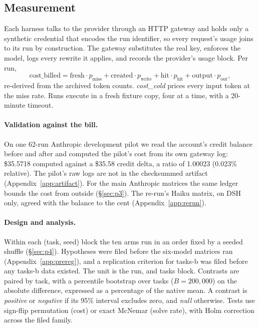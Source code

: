 \documentclass[10pt]{article}
\begin{document}
\subsection{Measurement}\label{sec:measurement}

Each harness talks to the provider through an HTTP gateway and holds only a synthetic credential that
encodes the run identifier, so every request's usage joins to its run by construction. The gateway
substitutes the real key, enforces the model, logs every rewrite it applies, and records the
provider's usage block. Per run,
\[
\text{cost\_billed} = \text{fresh}\cdot p_{\text{miss}} + \text{created}\cdot p_{\text{write}} +
\text{hit}\cdot p_{\text{hit}} + \text{output}\cdot p_{\text{out}},
\]
re-derived from the archived token counts. \emph{cost\_cold} prices every input token at the miss
rate. Runs execute in a fresh fixture copy, four at a time, with a 20-minute timeout.

\paragraph{Validation against the bill.} On one 62-run Anthropic development pilot we read the account's credit
balance before and after and computed the pilot's cost from its own gateway log: \$35.5718 computed
against a \$35.58 credit delta, a ratio of 1.00023 (0.023\% relative). The pilot's raw logs are not in
the checksummed artifact (Appendix~\ref{app:artifact}). For the main Anthropic matrices the same ledger
bounds the cost from outside (\S\ref{sec:p3}). The re-run's Haiku matrix, on DSH only, agreed with
the balance to the cent (Appendix~\ref{app:rerun}).

\paragraph{Design and analysis.} Within each (task, seed) block the ten arms run in an order fixed by
a seeded shuffle (\S\ref{sec:p4}). Hypotheses were filed before the six-model matrices ran
(Appendix~\ref{app:prereg}), and a replication criterion for tasks-b was filed before any tasks-b data
existed. The unit is the run, and tasks block. Contrasts are paired by task, with a percentile
bootstrap over tasks ($B = 200{,}000$) on the absolute difference, expressed as a percentage of the
native mean. A contrast is \emph{positive} or \emph{negative} if its 95\% interval excludes zero, and
\emph{null} otherwise. Tests use sign-flip permutation (cost) or exact McNemar (solve rate), with Holm
correction across the filed family.
\end{document}
